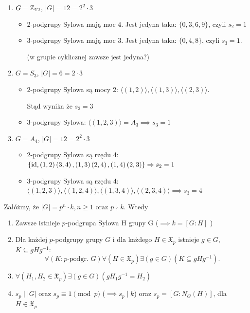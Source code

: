 \begin{enumerate}[label=\arabic*)]
	\item $G = \mathbb{Z}_{12}$, $\left| G \right| = 12 = 2^{2}\cdot 3$
		\begin{itemize}
			\item 2-podgrupy Sylowa mają moc 4. Jest jedyna taka: $\{0,3,6,9\} $, czyli $s_{2} = 1$ 
			\item 3-podgrupy Sylowa mają moc 3. Jest jedyna taka:  $\{0,4,8\} $, czyli $s_3 = 1$.

				(w grupie cyklicznej zawsze jest jedyna?)
		\end{itemize}
	\item $G=S_3$, $\left| G \right| = 6 = 2\cdot 3$ 
		\begin{itemize}
			\item 2-podgrupy Sylowa są mocy 2: $\langle \left( 1,2 \right)  \rangle , \langle \left( 1,3 \right)  \rangle , \langle \left( 2,3 \right)  \rangle $.

				Stąd wynika że $s_{2}= 3$
			\item 3-podgrupy Sylowa: $\langle \left( 1,2,3 \right)  \rangle = A_3 \implies s_{3} = 1$
		\end{itemize}
	\item $G = A_4$, $\left| G \right| = 12 = 2^2\cdot 3$
		\begin{itemize}
			\item 2-podgrupy Sylowa są rzędu 4: $\{\operatorname{id}, \left( 1,2 \right)\left( 3,4 \right), \left( 1,3 \right)\left( 2,4 \right), \left( 1,4 \right)\left( 2,3 \right) \} \Rightarrow s_2=1$ 
			\item 3-podgrupy Sylowa są rzędu 4:
				$\langle \left( 1,2,3 \right)  \rangle , \langle \left( 1,2,4 \right)  \rangle , \langle \left( 1,3,4 \right)  \rangle , \langle \left( 2,3,4 \right)  \rangle \implies s_3= 4$
		\end{itemize}
\end{enumerate}
\begin{theorem}[Sylowa]
	Załóżmy, że $\left| G \right| = p^{n}\cdot k, n\ge 1\text{ oraz }p\nmid k$. Wtedy
	\begin{enumerate}[label=\arabic*.]
		\item Zawsze istnieje  $p$-podgrupa Sylowa H grupy G ($\implies k = \left[ G:H \right] $ ) 
		\item Dla każdej $p$-podgrupy grupy $G$ i dla każdego $H\in \mathfrak{X}_{p}$ istnieje $g\in G$, $K\subseteq gHg^{-1}$:
			\[
				\forall\left(K \colon \text{$p$-podgr. } G\right) \forall\left(H \in \mathfrak{X}_{p}\right) \exists\left(g \in G\right) \left( K \subseteq gHg^{-1} \right)
			.\] 
		\item $\forall\left(H_1,H_2\in \mathfrak{X}_{p}\right)\exists\left(g\in G\right)\left( gH_1g^{-1} = H_2\right)   $ 
		\item $s_{p} \mid \left| G \right| $ oraz $s_{p} \equiv 1 \pmod{p}$ ($\implies s_{p}\mid k$) oraz $s_{p} = \left[ G: N_{G}(H) \right] $, dla $H \in \mathfrak{X}_{p}$
	\end{enumerate}
\end{theorem} 

